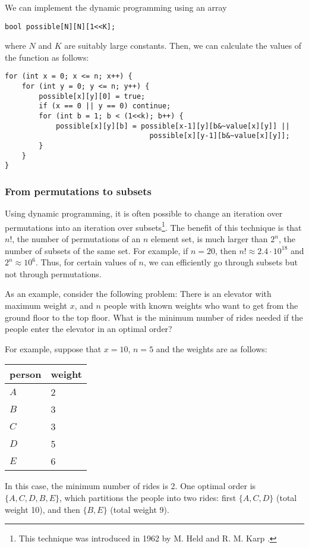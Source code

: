 We can implement the dynamic programming using an array
\begin{lstlisting}
bool possible[N][N][1<<K];
\end{lstlisting}
where $N$ and $K$ are suitably large constants.
Then, we can calculate the values
of the function as follows:
\begin{lstlisting}
for (int x = 0; x <= n; x++) {
    for (int y = 0; y <= n; y++) {
        possible[x][y][0] = true;
        if (x == 0 || y == 0) continue;
        for (int b = 1; b < (1<<k); b++) {
            possible[x][y][b] = possible[x-1][y][b&~value[x][y]] ||
                                  possible[x][y-1][b&~value[x][y]];
        }
    }
}
\end{lstlisting}

\subsubsection{From permutations to subsets}

Using dynamic programming, it is often possible
to change an iteration over permutations into
an iteration over subsets\footnote{This technique was introduced in 1962
by M. Held and R. M. Karp \cite{hel62}.}.
The benefit of this technique is that
$n!$, the number of permutations of an $n$ element set,
is much larger than $2^n$, the number of subsets
of the same set.
For example, if $n=20$, then
$n! \approx 2.4 \cdot 10^{18}$ and $2^n \approx 10^6$.
Thus, for certain values of $n$,
we can efficiently go through subsets but not through permutations.

As an example, consider the following problem:
There is an elevator with maximum weight $x$,
and $n$ people with known weights
who want to get from the ground floor
to the top floor.
What is the minimum number of rides needed
if the people enter the elevator in an optimal order?

For example, suppose that $x=10$, $n=5$
and the weights are as follows:
\begin{center}
\begin{tabular}{ll}
person & weight \\
\hline
$A$ & 2 \\
$B$ & 3 \\
$C$ & 3 \\
$D$ & 5 \\
$E$ & 6 \\
\end{tabular}
\end{center}
In this case, the minimum number of rides is 2.
One optimal order is $\{A,C,D,B,E\}$,
which partitions the people into two rides:
first $\{A,C,D\}$ (total weight 10),
and then $\{B,E\}$ (total weight 9).

